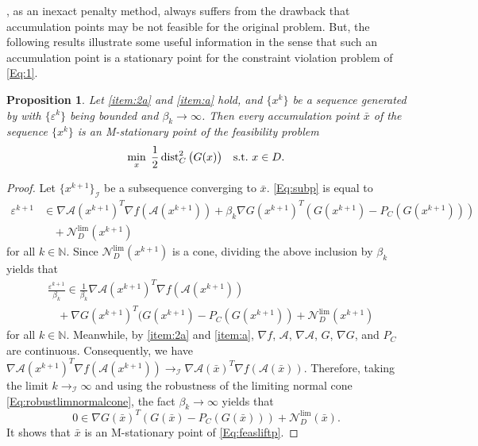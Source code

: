 \documentclass[11pt,a4paper,reqno]{amsart}
\newtheorem{proposition}[theorem]{Proposition}
\begin{document}
{, as an inexact penalty method, always suffers from the drawback that accumulation points may be not feasible for the original problem. But, the following results illustrate some useful information in the sense that such an accumulation point is a stationary point for the constraint violation problem of \eqref{Eq:1}.
\begin{proposition}\label{Prop:feas}
    Let  \ref{item:2a} and \ref{item:a} hold, and $\{x^k\}$ be a sequence generated by  with 
$\{\varepsilon^k\}$ being bounded and $\beta_k\to \infty$. Then every accumulation point $\bar{x}$ of the sequence 
$\{x^k\}$ is an M-stationary point of the feasibility problem
\begin{equation}\label{Eq:feasliftp}
\min_{x} \;
\frac{1}{2}\operatorname{dist}_C^2\big(G(x)\big)
\quad \text{\rm s.t.}\ x\in D.
\end{equation}
\end{proposition}

\begin{proof}
    Let $\{x^{k+1}\}_{\mathcal I}$ be a subsequence converging to $\bar x$. \eqref{Eq:subp} is equal to
    \begin{equation}\label{Eq:samesubp}
    \begin{aligned}
  \varepsilon^{k+1}& \in \nabla \mathcal A(x^{k+1})^T \nabla f(\mathcal A(x^{k+1})) +\beta_k \nabla G(x^{k+1})^T \left(G(x^{k+1})-P_C(G(x^{k+1}))\right)\\
  &~~~~+ \mathcal N_D^{\text{lim}}(x^{k+1})
       \end{aligned}
    \end{equation}
    for all $k\in \mathbb N$.
    Since $\mathcal N_D^{\text{lim}}(x^{k+1})$ is a cone, dividing the above inclusion by $\beta_k$ yields that
    \begin{equation*}
        \begin{aligned}
      & \frac{\varepsilon^{k+1}}{\beta_k}\in \frac{1}{\beta_k}
      \nabla \mathcal A(x^{k+1})^T \nabla f(\mathcal A(x^{k+1}))\\
       &~~~~+\nabla G(x^{k+1})^T(G(x^{k+1})-P_C(G(x^{k+1}))+\mathcal N_D^{\text{lim}}(x^{k+1})
       \end{aligned}
    \end{equation*}
    for all $k\in \mathbb N$. Meanwhile, by  \ref{item:2a} and \ref{item:a}, $\nabla f$, $\mathcal A$, $\nabla \mathcal A$, $G$, $\nabla G$, and $P_C$ are continuous. Consequently, we have $\nabla \mathcal A(x^{k+1})^T \nabla f(\mathcal A(x^{k+1})) \to_{\mathcal I} \nabla \mathcal A(\bar x)^T \nabla f(\mathcal A(\bar x))$. Therefore, taking the limit $k \to_{\mathcal I} \infty$ and using the robustness of the limiting normal cone \eqref{Eq:robustlimnormalcone}, the fact $\beta_k \to \infty$ yields that
    \begin{equation*}
        0\in\nabla G(\bar x)^T \left( G(\bar x)-P_C(G(\bar x)) \right)+\mathcal N_D^{\text{lim}}(\bar x).
    \end{equation*}
    It shows that $\bar x$ is an M-stationary point of \eqref{Eq:feasliftp}.
\end{proof}

}
\end{document}
